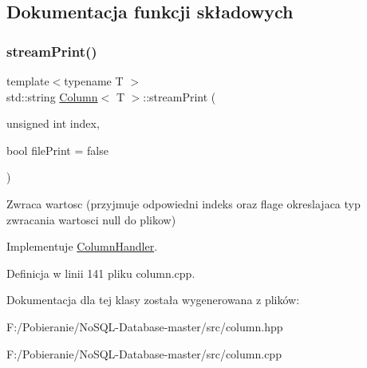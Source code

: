 \subsection{Dokumentacja funkcji składowych}
\mbox{\label{class_column_a01f68d75e582070faf9b53e49a50c740}} 
\subsubsection{\texorpdfstring{stream\+Print()}{streamPrint()}}
{\footnotesize\ttfamily template$<$typename T $>$ \\
std\+::string \mbox{\hyperlink{class_column}{Column}}$<$ T $>$\+::stream\+Print (\begin{DoxyParamCaption}\item[{unsigned int}]{index,  }\item[{bool}]{file\+Print = {\ttfamily false} }\end{DoxyParamCaption})\hspace{0.3cm}{\ttfamily [virtual]}}

Zwraca wartosc (przyjmuje odpowiedni indeks oraz flage okreslajaca typ zwracania wartosci null do plikow) 

Implementuje \mbox{\hyperlink{class_column_handler}{Column\+Handler}}.



Definicja w linii 141 pliku column.\+cpp.



Dokumentacja dla tej klasy została wygenerowana z plików\+:\begin{DoxyCompactItemize}
\item 
F\+:/\+Pobieranie/\+No\+S\+Q\+L-\/\+Database-\/master/src/column.\+hpp\item 
F\+:/\+Pobieranie/\+No\+S\+Q\+L-\/\+Database-\/master/src/column.\+cpp\end{DoxyCompactItemize}
